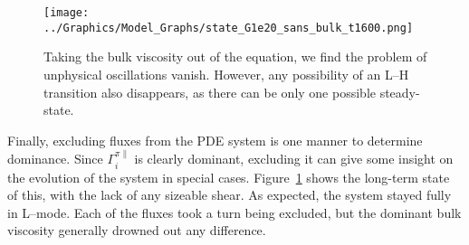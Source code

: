 \begin{figure}[htb] %
\begin{minipage}{0.49\linewidth}
	\centering
	\texttt{[image: ../Graphics/Model\_Graphs/state\_G1e20\_sans\_bulk\_t1600.png]}
\end{minipage}
\hfill
\begin{minipage}{0.49\linewidth}
	\caption{Taking the bulk viscosity out of the equation, we find the problem of unphysical oscillations vanish.
	However, any possibility of an L--H transition also disappears, as there can be only one possible steady-state.}
	\label{fig:sans_bulk}
\end{minipage}
\end{figure}

Finally, excluding fluxes from the PDE system is one manner to determine dominance.
Since $\Gamma_i^{\pi\parallel}$ is clearly dominant, excluding it can give some insight on the evolution of the system in special cases.
Figure~\ref{fig:sans_bulk} shows the long-term state of this, with the lack of any sizeable shear.
As expected, the system stayed fully in L--mode.
Each of the fluxes took a turn being excluded, but the dominant bulk viscosity generally drowned out any difference.

